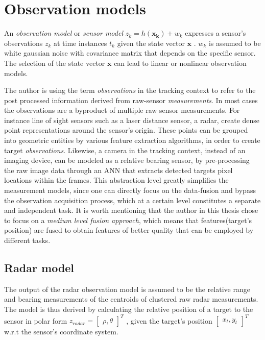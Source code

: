 
\section{Observation models}

An \emph{observation model} or \emph{sensor model} $z_k = h(\mathbf{x_k}) + w_k$ expresses a sensor's observations $z_k$ at time instances $t_k$ given the state vector $\mathbf{x}$ . $w_k$ is assumed to be white gaussian noise with covariance matrix that depends on the specific sensor. The selection of the state vector $\mathbf{x}$ can lead to linear or nonlinear observation models.

The author is using the term \emph{observations} in the tracking context to refer to the post processed information derived from raw-sensor \emph{measurements}. In most cases the observations are a byproduct of multiple raw sensor measurements. For instance line of sight sensors such as a laser distance sensor, a radar, create dense point representations around the sensor's origin. These points can be grouped into geometric entities by various feature extraction algorithms, in order to create target \emph{observations}.  Likewise, a camera in the tracking context, instead of an imaging device, can be modeled as a relative bearing sensor, by pre-processing the raw image data through an ANN that extracts detected targets pixel locations within the frames. This abstraction level greatly simplifies the measurement models, since one can directly focus on the data-fusion and bypass the observation acquisition process, which at a certain level constitutes a separate and independent task. It is worth mentioning that the author in this thesis chose to focus on a \emph{medium level fusion approach}\cite{Luo2002}, which means that features(target's position) are fused to obtain features of better quality that can be employed by different tasks.





\subsection{Radar model}

The output of the radar observation model is assumed to be the relative range and bearing measurements of the centroids of clustered raw radar measurements. The model is thus derived by calculating the relative position of a target to the sensor in polar form $z_{radar} = \begin{bmatrix}
\rho,
\theta
\end{bmatrix}^{T}$ , given the target's position $\begin{bmatrix}x_t, y_t\end{bmatrix}^{T}$ w.r.t the sensor's coordinate system.

